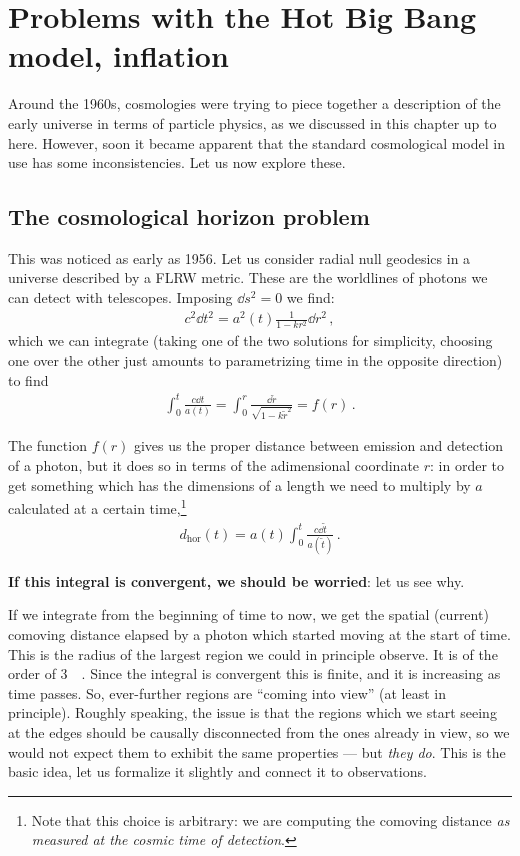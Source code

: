 \documentclass[main.tex]{subfiles}
\begin{document}

\section{Problems with the Hot Big Bang model, inflation}

Around the 1960s, cosmologies were trying to piece together a description of the early universe in terms of particle physics, as we discussed in this chapter up to here.
However, soon it became apparent that the standard cosmological model in use has some inconsistencies.
Let us now explore these. 

\subsection{The cosmological horizon problem}

This was noticed as early as 1956. 
Let us consider radial null geodesics in a universe described by a FLRW metric. These are the worldlines of photons we can detect with telescopes.
Imposing \(\dd{s}^2 = 0 \) we find: 
%
\begin{align}
  c^2 \dd{t^2} = a^2(t) \frac{1}{1-kr^2} \dd{r^2} 
\,,
\end{align}
%
which we can integrate (taking one of the two solutions for simplicity, choosing one over the other just amounts to parametrizing time in the opposite direction) to find
%
\begin{align}
  \int_0^{t} \frac{c \dd{t}}{a(t)} = \int_0^r \frac{ \dd{\widetilde{r}} }{\sqrt{1-k \widetilde{r}^2}} = f(r)
\,.
\end{align}

The function \(f(r)\) gives us the proper distance between emission and detection of a photon, but it does so in terms of the adimensional coordinate \(r\): in order to get something which has the dimensions of a length we need to multiply by \(a\) calculated at a certain time,\footnote{Note that this choice is arbitrary: we are computing the comoving distance \emph{as measured at the cosmic time of detection}.}
%
\begin{align}
  d _{\text{hor}} (t) = a(t) \int_0^{t} \frac{c \dd{\widetilde{t}}}{a(\widetilde{t})}
\,.
\end{align}

\textbf{If this integral is convergent, we should be worried}: let us see why.

If we integrate from the beginning of time to now, we get the spatial (current) comoving distance elapsed by a photon which started moving at the start of time.
This is the radius of the largest region we could in principle observe. It is of the order of \SI{3}{\giga\parsec}.
Since the integral is convergent this is finite, and it is increasing as time passes. So, ever-further regions are ``coming into view'' (at least in principle). 
Roughly speaking, the issue is that the regions which we start seeing at the edges should be causally disconnected from the ones already in view, so we would not expect them to exhibit the same properties --- but \emph{they do}.
This is the basic idea, let us formalize it slightly and connect it to observations.
\end{document}
